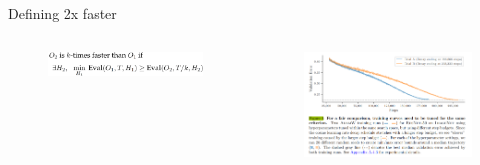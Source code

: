 \documentclass[
	11pt, %
	aspectratio=169, %
]{beamer}
\begin{document}
\begin{frame}{Defining 2x faster }
\begin{columns}[c] %
		\begin{column}{0.45\textwidth} %
			\begin{figure}
				\includegraphics[width=7cm]{figures/2xfaster.png}
			\end{figure}
		\end{column}
		\begin{column}{0.55\textwidth} %
        	\begin{figure}
        	    \centering
                \includegraphics[width=7.5cm]{figures/figure4_dahl_et_al.PNG}
        	\end{figure}
		\end{column}
	\end{columns}
\end{frame}


\end{document}
